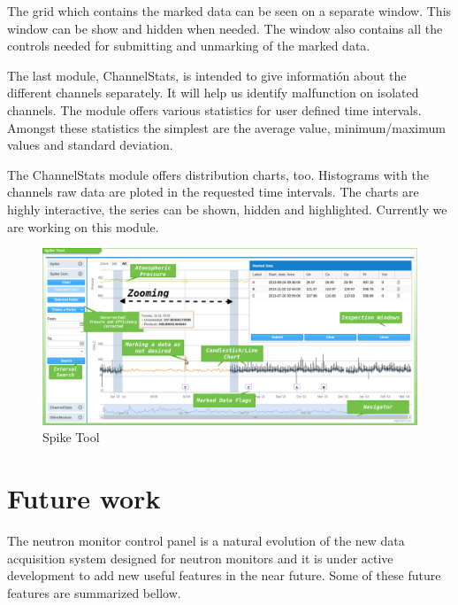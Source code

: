 \documentclass[a4paper]{jpconf}
\begin{document}
The grid which contains the marked data can be seen on a separate window. This
window can be show and hidden when needed. The window also contains all the
controls needed for submitting and unmarking of the marked data.

The last module, ChannelStats, is intended to give informatión about the
different channels separately. It will help us identify malfunction on isolated
channels. The module offers various statistics for user defined time intervals.
Amongst these statistics the simplest are the average value, minimum/maximum
values and standard deviation.

The ChannelStats module offers distribution charts, too. Histograms with the
channels raw data are ploted in the requested time intervals. The charts are
highly interactive, the series can be shown, hidden and highlighted. Currently
we are working on this module.

\begin{figure}[h]
    \centering
    \includegraphics[keepaspectratio, width=1\textwidth]{./resources/SpikeTool.png}
    \caption{Spike Tool}
    \label{fig:arch}
\end{figure}

\section{Future work}

The neutron monitor control panel is a natural evolution of the new data
acquisition system designed for neutron monitors and it is under active
development to add new useful features in the near future. Some of these future
features are summarized bellow.
\end{document}
